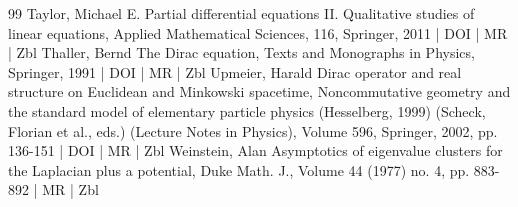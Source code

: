 \documentclass[10pt]{amsart}
\theoremstyle{definition}\newtheorem{defi}[theo]{Definition}\newtheorem{rema}[theo]{Remark}\newtheorem{exam}[theo]{Example}\newtheorem{nota}[theo]{Notation}
\begin{document}
\begin{thebibliography}{99}
Taylor, Michael E. Partial differential equations II. Qualitative studies of linear equations, Applied Mathematical Sciences, 116, Springer, 2011 | DOI | MR | Zbl
Thaller, Bernd The Dirac equation, Texts and Monographs in Physics, Springer, 1991 | DOI | MR | Zbl
Upmeier, Harald Dirac operator and real structure on Euclidean and Minkowski spacetime, Noncommutative geometry and the standard model of elementary particle physics (Hesselberg, 1999) (Scheck, Florian et al., eds.) (Lecture Notes in Physics), Volume 596, Springer, 2002, pp. 136-151 | DOI | MR | Zbl
Weinstein, Alan Asymptotics of eigenvalue clusters for the Laplacian plus a potential, Duke Math. J., Volume 44 (1977) no. 4, pp. 883-892 | MR | Zbl
\end{thebibliography}
\end{document}
